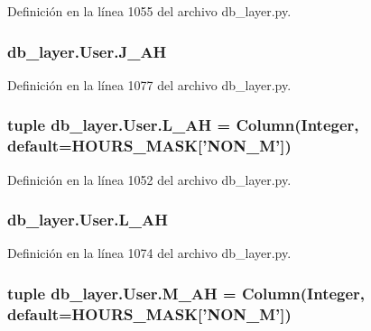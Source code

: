 Definición en la línea 1055 del archivo db\-\_\-layer.\-py.

\hypertarget{classdb__layer_1_1_user_a41f3568a4ad9b61374e53e3a44a23894}{
\subsubsection[{J\-\_\-\-A\-H}]{\setlength{\rightskip}{0pt plus 5cm}db\-\_\-layer.\-User.\-J\-\_\-\-A\-H}}\label{classdb__layer_1_1_user_a41f3568a4ad9b61374e53e3a44a23894}


Definición en la línea 1077 del archivo db\-\_\-layer.\-py.

\hypertarget{classdb__layer_1_1_user_a3746b030cfe8c68de00434e7f7aa55e8}{
\subsubsection[{L\-\_\-\-A\-H}]{\setlength{\rightskip}{0pt plus 5cm}tuple db\-\_\-layer.\-User.\-L\-\_\-\-A\-H = Column(Integer, default={\bf H\-O\-U\-R\-S\-\_\-\-M\-A\-S\-K}\mbox{[}'N\-O\-N\-\_\-\-M'\mbox{]})\hspace{0.3cm}{\ttfamily [static]}}}\label{classdb__layer_1_1_user_a3746b030cfe8c68de00434e7f7aa55e8}


Definición en la línea 1052 del archivo db\-\_\-layer.\-py.

\hypertarget{classdb__layer_1_1_user_afd2659105a8f031b05e128a7e6280e3d}{
\subsubsection[{L\-\_\-\-A\-H}]{\setlength{\rightskip}{0pt plus 5cm}db\-\_\-layer.\-User.\-L\-\_\-\-A\-H}}\label{classdb__layer_1_1_user_afd2659105a8f031b05e128a7e6280e3d}


Definición en la línea 1074 del archivo db\-\_\-layer.\-py.

\hypertarget{classdb__layer_1_1_user_aca612c160e61b610ecb37dd55b83f528}{
\subsubsection[{M\-\_\-\-A\-H}]{\setlength{\rightskip}{0pt plus 5cm}tuple db\-\_\-layer.\-User.\-M\-\_\-\-A\-H = Column(Integer, default={\bf H\-O\-U\-R\-S\-\_\-\-M\-A\-S\-K}\mbox{[}'N\-O\-N\-\_\-\-M'\mbox{]})\hspace{0.3cm}{\ttfamily [static]}}}\label{classdb__layer_1_1_user_aca612c160e61b610ecb37dd55b83f528}


